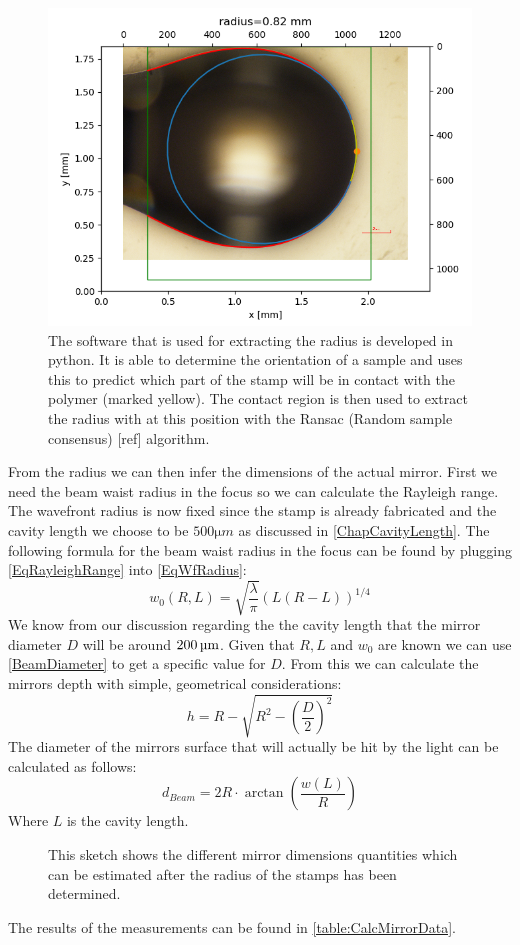 \begin{figure}[H]
	\includegraphics[scale=0.6]{source/radius_analysis}
	\caption{The software that is used for extracting the radius is developed in python. It is able to determine the orientation of a sample and uses this to predict which part of the stamp will be in contact with the polymer (marked yellow). The contact region is then used to extract the radius with at this position with the Ransac (Random sample consensus) [ref] algorithm.}
\end{figure}
From the radius we can then infer the dimensions of the actual mirror. First we need the beam waist radius in the focus so we can calculate the Rayleigh range. The wavefront radius is now fixed since the stamp is already fabricated and the cavity length we choose to be $500\si{\micro m}$ as discussed in \autoref{ChapCavityLength}. The following formula for the beam waist radius in the focus can be found by plugging \autoref{EqRayleighRange} into \autoref{EqWfRadius}:
\begin{equation}
	w_0(R, L)=\sqrt{\frac{\lambda}{\pi}}\left(L(R-L)\right)^{1/4}
\end{equation}
We know from our discussion regarding the the cavity length that the mirror diameter $D$ will be around $200\um$. Given that $R, L$ and $w_0$ are known we can use \autoref{BeamDiameter} to get a specific value for $D$. From this we can calculate the mirrors depth with simple, geometrical considerations:
\begin{equation}\label{EqH}
	h=R-\sqrt{R^2-\left(\frac{D}{2}\right)^2}
\end{equation}
The diameter of the mirrors surface that will actually be hit by the light can be calculated as follows:
\begin{equation}
	d_{\si{Beam}}=2R\cdot \arctan\left(\frac{w(L)}{R}\right)
\end{equation}
Where $L$ is the cavity length.
\begin{figure}[H]
	
	\caption{This sketch shows the different mirror dimensions quantities which can be estimated after the radius of the stamps has been determined.}
\end{figure}
The results of the measurements can be found in \autoref{table:CalcMirrorData}.

